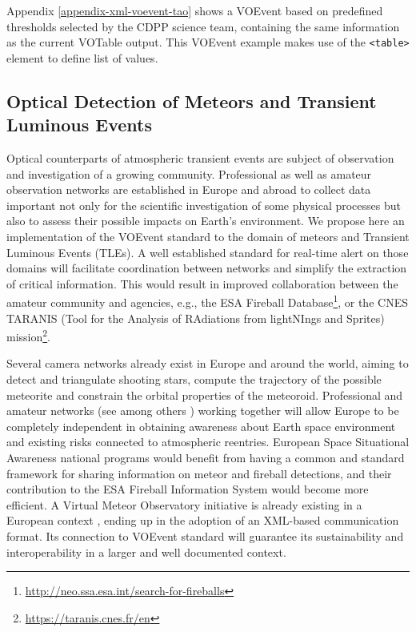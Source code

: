\documentclass[referee,a4paper,12pt,traditabstract]{swsc}
\begin{document}
\begin{linenumbers}
Appendix \ref{appendix-xml-voevent-tao} shows a VOEvent based on predefined thresholds selected by the CDPP science team, containing the same information as the current VOTable output. This VOEvent example makes use of the {\tt <table>} element to define list of values.

\subsection{Optical Detection of Meteors and Transient Luminous Events}
Optical counterparts of atmospheric transient events are subject of observation and investigation of a growing community. Professional as well as amateur observation networks are established in Europe and abroad to collect data important not only for the scientific investigation of some physical processes but also to assess their possible impacts on Earth's environment. We propose here an implementation of the VOEvent standard to the domain of meteors and Transient Luminous Events (TLEs). A well established standard for real-time alert on those domains will facilitate coordination between networks and simplify the extraction of critical information. This would result in improved collaboration between the amateur community and agencies, e.g., the ESA Fireball Database\footnote{\url{http://neo.ssa.esa.int/search-for-fireballs}}, or the CNES TARANIS (Tool for the Analysis of RAdiations from lightNIngs and Sprites) mission\footnote{\url{https://taranis.cnes.fr/en}}. 

Several camera networks already exist in Europe and around the world, aiming to detect and triangulate shooting stars, compute the trajectory of the possible meteorite and constrain the orbital properties of the meteoroid. Professional and amateur networks (see among others \cite{1998M&PS...33...49O, 2015EPSC...10..800C, 2016pimo.conf...76G, 2013pimo.conf..125J}) working together will allow Europe to be completely independent in obtaining awareness about Earth space environment and existing risks connected to atmospheric reentries. European Space Situational Awareness national programs would benefit from having a common and standard framework for sharing information on meteor and fireball detections, and their contribution to the ESA Fireball Information System would become more efficient. A Virtual Meteor Observatory initiative is already existing in a European context \cite{2008EM&P..102..247K, 2010JIMO...38...10B}, ending up in the adoption of an XML-based communication format. Its connection to VOEvent standard will guarantee its sustainability and interoperability in a larger and well documented context.


\end{linenumbers}
\end{document}
